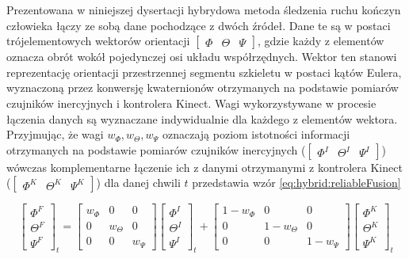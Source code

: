 Prezentowana w niniejszej dysertacji hybrydowa metoda śledzenia ruchu kończyn człowieka łączy ze sobą dane pochodzące z dwóch źródeł. Dane te są w postaci trójelementowych wektorów orientacji $\begin{bmatrix}  \Phi &  \Theta & \Psi \end{bmatrix}$, gdzie każdy z elementów oznacza obrót wokół pojedynczej osi układu współrzędnych. Wektor ten stanowi reprezentację orientacji przestrzennej segmentu szkieletu w postaci kątów Eulera, wyznaczoną przez konwersję kwaternionów otrzymanych na podstawie pomiarów czujników inercyjnych i kontrolera Kinect. Wagi wykorzystywane w procesie łączenia danych są wyznaczane indywidualnie dla każdego z elementów wektora. Przyjmując, że wagi $w_\Phi , w_\Theta , w_\Psi$ oznaczają poziom istotności informacji otrzymanych na podstawie pomiarów czujników inercyjnych ($\begin{bmatrix}  \Phi^I &  \Theta^I &  \Psi^I \end{bmatrix}$) wówczas komplementarne łączenie ich z danymi otrzymanymi z kontrolera Kinect ($\begin{bmatrix}  \Phi^K &  \Theta^K &  \Psi^K \end{bmatrix}$) dla danej chwili $t$ przedstawia wzór \eqref{eq:hybrid:reliableFusion}

\begin{equation}
\begin{bmatrix}  \Phi^F \\  \Theta^F \\  \Psi^F \end{bmatrix}_t = 
\begin{bmatrix}  w_\Phi&0&0 \\  0&w_\Theta&0 \\  0&0&w_\Psi \end{bmatrix}
\begin{bmatrix}  \Phi^I \\  \Theta^I \\  \Psi^I \end{bmatrix}_t + 
\begin{bmatrix}  1-w_\Phi&0&0 \\  0&1-w_\Theta&0 \\  0&0&1-w_\Psi \end{bmatrix}
\begin{bmatrix}  \Phi^K \\  \Theta^K \\  \Psi^K \end{bmatrix}_t
\label{eq:hybrid:reliableFusion}
\end{equation}

